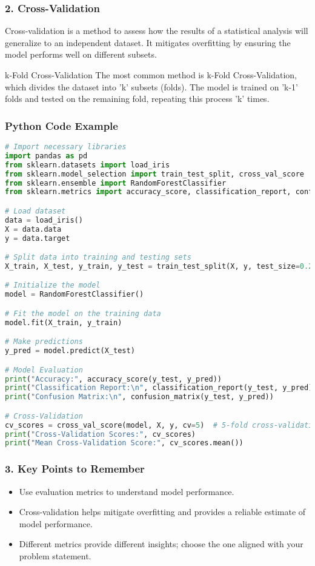 \documentclass[aspectratio=169]{beamer}
\begin{document}
\begin{frame}
    \frametitle{2. Cross-Validation}
    Cross-validation is a method to assess how the results of a statistical analysis will generalize to an independent dataset. It mitigates overfitting by ensuring the model performs well on different subsets.

    \begin{block}{k-Fold Cross-Validation}
        The most common method is k-Fold Cross-Validation, which divides the dataset into 'k' subsets (folds). The model is trained on 'k-1' folds and tested on the remaining fold, repeating this process 'k' times.
    \end{block}
\end{frame}

\begin{frame}[fragile]
    \frametitle{Python Code Example}
    \begin{lstlisting}[language=Python]
# Import necessary libraries
import pandas as pd
from sklearn.datasets import load_iris
from sklearn.model_selection import train_test_split, cross_val_score
from sklearn.ensemble import RandomForestClassifier
from sklearn.metrics import accuracy_score, classification_report, confusion_matrix

# Load dataset
data = load_iris()
X = data.data
y = data.target

# Split data into training and testing sets
X_train, X_test, y_train, y_test = train_test_split(X, y, test_size=0.2, random_state=42)

# Initialize the model
model = RandomForestClassifier()

# Fit the model on the training data
model.fit(X_train, y_train)

# Make predictions
y_pred = model.predict(X_test)

# Model Evaluation
print("Accuracy:", accuracy_score(y_test, y_pred))
print("Classification Report:\n", classification_report(y_test, y_pred))
print("Confusion Matrix:\n", confusion_matrix(y_test, y_pred))

# Cross-Validation
cv_scores = cross_val_score(model, X, y, cv=5)  # 5-fold cross-validation
print("Cross-Validation Scores:", cv_scores)
print("Mean Cross-Validation Score:", cv_scores.mean())
    \end{lstlisting}
\end{frame}

\begin{frame}
    \frametitle{3. Key Points to Remember}
    \begin{itemize}
        \item Use evaluation metrics to understand model performance.
        \item Cross-validation helps mitigate overfitting and provides a reliable estimate of model performance.
        \item Different metrics provide different insights; choose the one aligned with your problem statement.
    \end{itemize}
\end{frame}
\end{document}
